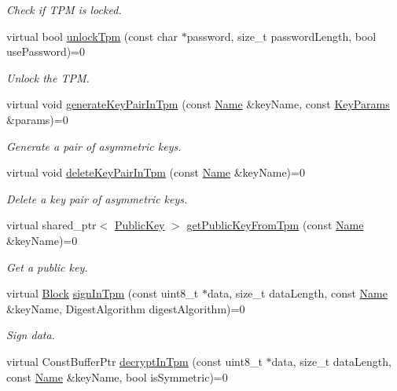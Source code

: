 \begin{DoxyCompactItemize}
\begin{DoxyCompactList}\small\item\em Check if T\+PM is locked. \end{DoxyCompactList}\item 
virtual bool \hyperlink{classndn_1_1SecTpm_ae3a84afa288b4c9f26e76844494a35c9}{unlock\+Tpm} (const char $\ast$password, size\+\_\+t password\+Length, bool use\+Password)=0
\begin{DoxyCompactList}\small\item\em Unlock the T\+PM. \end{DoxyCompactList}\item 
virtual void \hyperlink{classndn_1_1SecTpm_a2797668238aa960ecbf4c5ef8a87e2be}{generate\+Key\+Pair\+In\+Tpm} (const \hyperlink{classndn_1_1Name}{Name} \&key\+Name, const \hyperlink{classndn_1_1KeyParams}{Key\+Params} \&params)=0
\begin{DoxyCompactList}\small\item\em Generate a pair of asymmetric keys. \end{DoxyCompactList}\item 
virtual void \hyperlink{classndn_1_1SecTpm_ac8ab7264a1238207ca0ea5d93fbc7437}{delete\+Key\+Pair\+In\+Tpm} (const \hyperlink{classndn_1_1Name}{Name} \&key\+Name)=0
\begin{DoxyCompactList}\small\item\em Delete a key pair of asymmetric keys. \end{DoxyCompactList}\item 
virtual shared\+\_\+ptr$<$ \hyperlink{classndn_1_1PublicKey}{Public\+Key} $>$ \hyperlink{classndn_1_1SecTpm_aff13bb9e184005f6d3b18aa16271700b}{get\+Public\+Key\+From\+Tpm} (const \hyperlink{classndn_1_1Name}{Name} \&key\+Name)=0
\begin{DoxyCompactList}\small\item\em Get a public key. \end{DoxyCompactList}\item 
virtual \hyperlink{classndn_1_1Block}{Block} \hyperlink{classndn_1_1SecTpm_a6f5cc408b3de6ac8b375da21a27e704c}{sign\+In\+Tpm} (const uint8\+\_\+t $\ast$data, size\+\_\+t data\+Length, const \hyperlink{classndn_1_1Name}{Name} \&key\+Name, Digest\+Algorithm digest\+Algorithm)=0
\begin{DoxyCompactList}\small\item\em Sign data. \end{DoxyCompactList}\item 
virtual Const\+Buffer\+Ptr \hyperlink{classndn_1_1SecTpm_aac0479a2d251e726e3e1d9f042523302}{decrypt\+In\+Tpm} (const uint8\+\_\+t $\ast$data, size\+\_\+t data\+Length, const \hyperlink{classndn_1_1Name}{Name} \&key\+Name, bool is\+Symmetric)=0

\end{DoxyCompactItemize}
